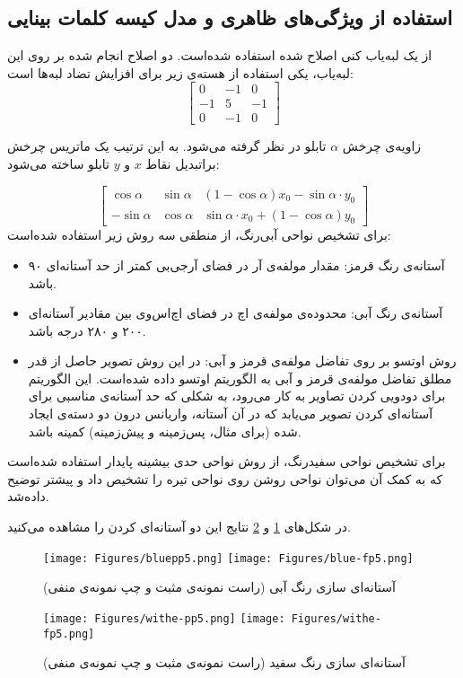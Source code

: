 \documentclass[oneside,openany,mscS]{SBU-Thesis}
\begin{document}
\subsection{استفاده از ویژگی‌های ظاهری و مدل کیسه کلمات بینایی}
\label{subsec:gonzalez}

از یک لبه‌یاب کنی اصلاح شده استفاده شده‌است. دو اصلاح انجام شده بر روی این لبه‌یاب، یکی استفاده از هسته‌ی زیر برای افزایش تضاد لبه‌ها است: 
\begin{equation}
\begin{bmatrix} 0 & -1 & 0 \\ -1 & 5 & -1 \\ 0 & -1 & 0 \end{bmatrix}
\end{equation}

زاویه‌ی چرخش 
$\alpha$
تابلو در نظر گرفته می‌شود. به این ترتیب یک ماتریس چرخش براتبدیل نقاط $x$ و $y$ تابلو ساخته می‌شود:

\begin{equation}
\begin{bmatrix} \cos \alpha & \sin \alpha & (1-\cos \alpha) x_0 - \sin \alpha \cdot y_0 \\
-\sin \alpha & \cos \alpha &  \sin \alpha \cdot x_0 + (1-\cos \alpha) y_0
\end{bmatrix}
\end{equation}
برای تشخیص نواحی آبی‌رنگ، از  منطقی سه روش زیر استفاده شده‌است: 
\begin{itemize}
	\item{آستانه‌ی رنگ قرمز}:
	مقدار مولفه‌ی آر در فضای آرجی‌بی کمتر از حد آستانه‌ای ۹۰ باشد.
	\item{آستانه‌ی رنگ آبی}:
	محدوده‌ی مولفه‌ی اچ در فضای اچ‌اس‌وی بین مقادیر آستانه‌ای ۲۰۰ و ۲۸۰ درجه باشد. 
	\item{روش اوتسو \cite{otsu1975threshold} بر روی تفاضل مولفه‌ی قرمز و آبی}:
	در این روش تصویر حاصل از قدر مطلق تفاضل مولفه‌ی قرمز و آبی به الگوریتم اوتسو داده‌ شده‌است. این الگوریتم برای دودویی کردن تصاویر به کار می‌رود، به شکلی که حد آستانه‌ی مناسبی برای آستانه‌ای کردن تصویر می‌یابد که در آن آستانه، واریانس درون دو دسته‌ی ایجاد شده (برای مثال، پس‌زمینه و پیش‌زمینه) کمینه باشد.
\end{itemize}
برای تشخیص نواحی سفیدرنگ، از روش نواحی حدی بیشینه پایدار استفاده شده‌است که به کمک آن می‌توان نواحی روشن روی نواحی تیره را تشخیص داد و پیشتر توضیح داده‌شد. 

در شکل‌های \ref{fig:bluep5} و \ref{fig:withep5} نتایج این دو آستانه‌ای کردن را مشاهده می‌کنید.
\begin{figure}[h]
	\centering
	\texttt{[image: Figures/bluepp5.png]}
	\texttt{[image: Figures/blue-fp5.png]}
	\caption[آستانه‌ای سازی رنگ آبی]{آستانه‌ای سازی رنگ آبی \cite{gonzalez2013traffic} (راست نمونه‌ی مثبت و چپ نمونه‌ی منفی)}
	\label{fig:bluep5}
\end{figure}
\begin{figure}[h]
	\centering
	\texttt{[image: Figures/withe-pp5.png]}
	\texttt{[image: Figures/withe-fp5.png]}
	\caption[آستانه‌ای سازی رنگ سفید]{آستانه‌ای سازی رنگ سفید \cite{gonzalez2013traffic} (راست نمونه‌ی مثبت و چپ نمونه‌ی منفی)}
	\label{fig:withep5}
\end{figure}
\end{document}
